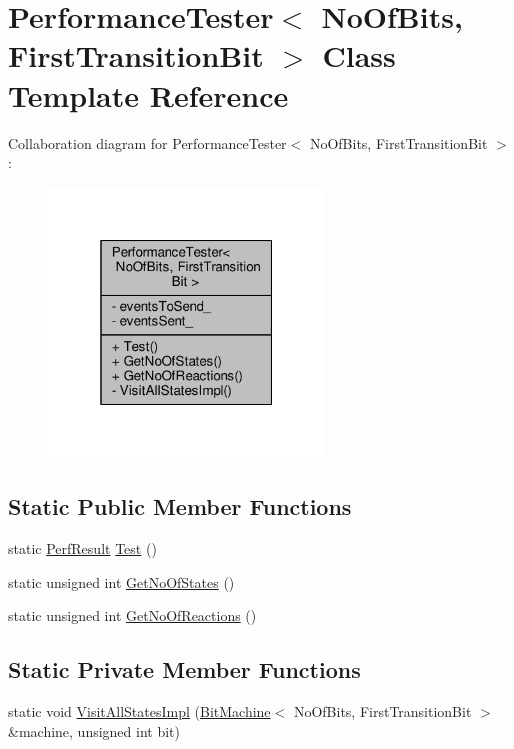 \hypertarget{class_performance_tester}{}\section{Performance\+Tester$<$ No\+Of\+Bits, First\+Transition\+Bit $>$ Class Template Reference}
\label{class_performance_tester}


Collaboration diagram for Performance\+Tester$<$ No\+Of\+Bits, First\+Transition\+Bit $>$\+:
\nopagebreak
\begin{figure}[H]
\begin{center}
\leavevmode
\includegraphics[width=208pt]{class_performance_tester__coll__graph}
\end{center}
\end{figure}
\subsection*{Static Public Member Functions}
\begin{DoxyCompactItemize}
\item 
static \mbox{\hyperlink{struct_perf_result}{Perf\+Result}} \mbox{\hyperlink{class_performance_tester_a17719ca44c7bd4c9641e7723de871f73}{Test}} ()
\item 
static unsigned int \mbox{\hyperlink{class_performance_tester_aeeb48301ea3b298398a1e45c3d60991d}{Get\+No\+Of\+States}} ()
\item 
static unsigned int \mbox{\hyperlink{class_performance_tester_a9dfb85f931131f3e6a734e38683d25d2}{Get\+No\+Of\+Reactions}} ()
\end{DoxyCompactItemize}
\subsection*{Static Private Member Functions}
\begin{DoxyCompactItemize}
\item 
static void \mbox{\hyperlink{class_performance_tester_accdf29cc546c012cd3db37a36cb555d4}{Visit\+All\+States\+Impl}} (\mbox{\hyperlink{struct_bit_machine}{Bit\+Machine}}$<$ No\+Of\+Bits, First\+Transition\+Bit $>$ \&machine, unsigned int bit)
\end{DoxyCompactItemize}
